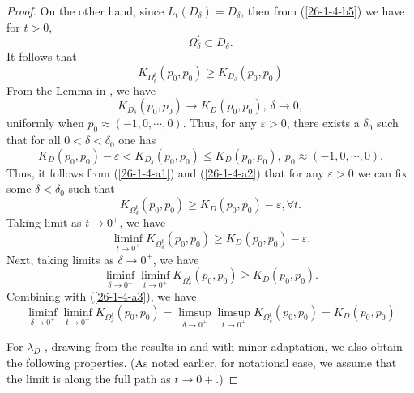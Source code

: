 \documentclass[a4paper,centertags,oneside,12pt]{amsart}
\numberwithin{equation}{section}
\begin{document}
\begin{proof}
On the other hand, since $L_t(D_\delta)=D_\delta$, then from (\ref{26-1-4-b5}) we have for $t>0$,
\begin{equation*}
    \Omega^t_{\delta}\subset D_\delta.
\end{equation*}
It follows that 
\begin{equation}\label{26-1-4-a1}
    K_{\Omega^t_\delta}(p_0,  p_0)\geq K_{D_\delta}(p_0,  p_0)
\end{equation}
From the Lemma in \cite[page 453]{BSY95}, we have
\begin{equation*}
    K_{D_\delta}(p_0, p_0)\rightarrow K_{D}(p_0,  p_0),~\delta\rightarrow 0,
\end{equation*}
uniformly when $p_0\approx(-1, 0, \cdots, 0)$.
Thus, for any $\varepsilon>0$, there exists a $\delta_0$ such that for all $0<\delta<\delta_0$ one has
\begin{equation}\label{26-1-4-a2}
    K_{D}(p_0,  p_0)-\varepsilon<K_{D_\delta}(p_0, p_0)\leq K_D(p_0,  p_0),~ p_0\approx(-1, 0, \cdots, 0).
\end{equation}
Thus, it follows from (\ref{26-1-4-a1}) and (\ref{26-1-4-a2}) that for any $\varepsilon>0$ we can fix some $\delta<\delta_0$ such that 
\begin{equation*}
    K_{\Omega^t_\delta}(p_0,  p_0)\geq K_D(p_0,  p_0)-\varepsilon, \forall t.
\end{equation*}
Taking limit as $t\rightarrow 0^{+}$, we have
\begin{equation*}
    \liminf_{t\rightarrow 0^+}K_{\Omega^t_\delta}(p_0,  p_0)\geq K_D(p_0, p_0)-\varepsilon.
\end{equation*}
Next, taking limits as $\delta\rightarrow 0^+$, we have
\begin{equation*}
    \liminf_{\delta\rightarrow 0^+} \liminf_{t\rightarrow 0^+}K_{\Omega^t_\delta}(p_0, p_0)\geq K_D(p_0, p_0).
\end{equation*}
Combining with (\ref{26-1-4-a3}), we have
\begin{equation}\label{26-1-4-a8}
    \liminf_{\delta\rightarrow 0^+}\liminf_{t\rightarrow 0^+}K_{\Omega^t_\delta}(p_0, p_0)=\limsup_{\delta\rightarrow 0^+}\limsup_{t\rightarrow 0^+}K_{\Omega^t_\delta}(p_0,  p_0)=K_D(p_0,  p_0)
\end{equation}

For  $\lambda_{D}$ , drawing from the results in \cite{KYu96} and \cite{BSY95} with minor adaptation, we also obtain the following  properties. (As noted earlier, for notational ease, we assume that the limit is along the full path as $t\rightarrow 0+$.)



\end{proof}
\end{document}
